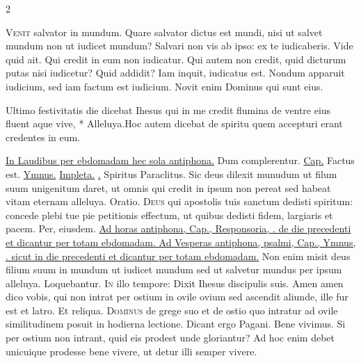 \begin{multicols*}{2}
\begin{responsory}
\end{responsory}%
\lettrine[lines=2]{\zallmancaps \color{Red} V}{enit} salvator in mundum. Quare salvator dictus est mundi, nisi ut salvet mundum non ut iudicet mundum? Salvari non vis ab ipso: ex te iudicaberis. Vide quid ait. Qui credit in eum non iudicatur. Qui autem non credit, quid dicturum putas nisi iudicetur? Quid addidit? Iam inquit, iudicatus est. Nondum apparuit iudicium, sed iam factum est iudicium. Novit enim Dominus qui sunt eius.
\begin{responsory-doxology}
{Ultimo festivitatis die dicebat Ihesus qui in me credit flumina de ventre eius fluent aque vive, * Alleluya.}{Hoc autem dicebat de spiritu quem accepturi erant credentes in eum.}
\end{responsory-doxology}%
\newline \ul{In Laudibus per ebdomadam hec sola antiphona.} Dum complerentur. \ul{Cap.} Factus est. \ul{Ymnus.} \hyperlink{impleta-gaudent-viscera}{Impleta.} \ul{\Vbar .} Spiritus Paraclitus.
 Sic deus dilexit munudum ut filum suum unigenitum daret, ut omnis qui credit in ipsum non pereat sed habeat vitam eternam alleluya. {\color{Red} Oratio.}
\lettrine[lines=2]{\zallmancaps \color{Blue} D}{eus} qui apostolis tuis sanctum dedisti spiritum: concede plebi tue pie petitionis effectum, ut quibus dedisti fidem, largiaris et pacem. Per, eiusdem.
\newline \ul{Ad horas antiphona, Cap., Responsoria, \Vbar . de die precedenti et dicantur per totam ebdomadam. Ad Vesperas antiphona, psalmi, Cap., Ymnus, \Vbar . sicut in die precedenti et dicantur per totam ebdomadam.}
 Non enim misit deus filium suum in mundum ut iudicet mundum sed ut salvetur mundus per ipsum alleluya.
 \V Loquebantur.
\lettrine[lines=2]{\zallmancaps \color{Red} I}{n} illo tempore: Dixit Ihesus discipulis suis. Amen amen dico vobis, qui non intrat per ostium in ovile ovium sed ascendit aliunde, ille fur est et latro. Et reliqua.
 \grecross
\lettrine[lines=2]{\zallmancaps \color{Blue} D}{ominus} de grege suo et de ostio quo intratur ad ovile similitudinem posuit in hodierna lectione. Dicant ergo Pagani. Bene vivimus. Si per ostium non intrant, quid eis prodest unde gloriantur? Ad hoc enim debet unicuique prodesse bene vivere, ut detur illi semper vivere. \R

\end{multicols*}
